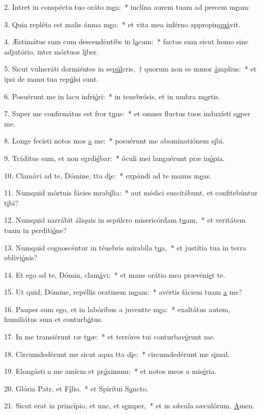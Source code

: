 2. Intret in conspéctu tuo oráto m\uline{e}a:~* inclína aurem tuam ad precem m\uline{e}am:\par 
3. Quia repléta est malis ánma m\uline{e}a:~* et vita mea inférno appropin\uline{quá}vit.\par 
4. Æstimátus sum cum descendéntibs in l\uline{a}cum:~* factus sum sicut homo sine adjutório, inter mórtuos l\uline{i}ber.\par 
5. Sicut vulneráti dormiéntes in se\uline{púl}cris,~† quorum non es mmor \uline{á}mplius:~* et ipsi de manu tua rep\uline{ú}lsi sunt.\par 
6. Posuérunt me in lacu infri\uline{ó}ri:~* in tenebrósis, et in umbra m\uline{o}rtis.\par 
7. Super me confirmátus est fror t\uline{u}us:~* et omnes fluctus tuos induxísti s\uline{u}per me.\par 
8. Longe fecísti notos mos \uline{a} me:~* posuérunt me abominatiónem s\uline{i}bi.\par 
9. Tráditus sum, et non egrdi\uline{é}bar:~* óculi mei languérunt præ in\uline{ó}pia.\par 
10. Clamávi ad te, Dómine, tta d\uline{i}e:~* expándi ad te manus m\uline{e}as.\par 
11. Numquid mórtuis fácies mrab\uline{í}lia:~* aut médici suscitábunt, et confitebúntur t\uline{i}bi?\par 
12. Numquid narrábit áliquis in sepúlcro misericórdam t\uline{u}am,~* et veritátem tuam in perditi\uline{ó}ne?\par 
13. Numquid cognoscéntur in ténebris mirabíla t\uline{u}a,~* et justítia tua in terra oblivi\uline{ó}nis?\par 
14. Et ego ad te, Dómin, clam\uline{á}vi:~* et mane orátio mea prævéni\uline{e}t te.\par 
15. Ut quid, Dómine, repéllis oratinem m\uline{e}am:~* avértis fáciem tuam \uline{a} me?\par 
16. Pauper sum ego, et in labóribus a juventte m\uline{e}a:~* exaltátus autem, humiliátus sum et conturb\uline{á}tus.\par 
17. In me transiérunt ræ t\uline{u}æ:~* et terróres tui conturbav\uline{é}runt me.\par 
18. Circumdedérunt me sicut aqua tta d\uline{i}e:~* circumdedérunt me s\uline{i}mul.\par 
19. Elongásti a me amícm et pr\uline{ó}ximum:~* et notos meos a mis\uline{é}ria.\par 
20. Glória Patr, et F\uline{í}lio,~* et Spirítui S\uline{a}ncto.\par 
21. Sicut erat in princípio, et nnc, et s\uline{e}mper,~* et in sǽcula sæculórum. \uline{A}men.\par 
